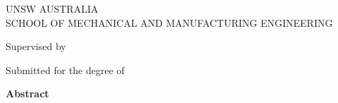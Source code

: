 \setcounter{page}{1}

\newpage
\thispagestyle{empty}
\begin{center}
  {\LARGE UNSW AUSTRALIA \\
		  [1cm] SCHOOL OF MECHANICAL AND MANUFACTURING ENGINEERING}
  \vspace*{3cm}
  
  {\Huge \bf \thesistitle}
  \vspace*{2cm}

  {\LARGE\bf \authorname}
  
  {\LARGE \authorstudentid}

  \vfill

  {\Large  \authordegree}
  \vspace*{1cm}

  {\large \thesismonthyear}
  \vspace*{1cm}  
          
  {\Large Supervised by \supervisorname}
  \vspace*{2cm}

\end{center}

\newpage
\thispagestyle{empty}
\begin{center}
  \textbf{\Large \thesistitle}

  \vspace*{1cm}
  \textbf{\large \authorname}

  \vspace*{0.5cm}
  {\large Submitted for the degree of \authordegree\\ \thesismonthyear}

  \vspace*{1cm}
  \textbf{\large Abstract}
\end{center}

